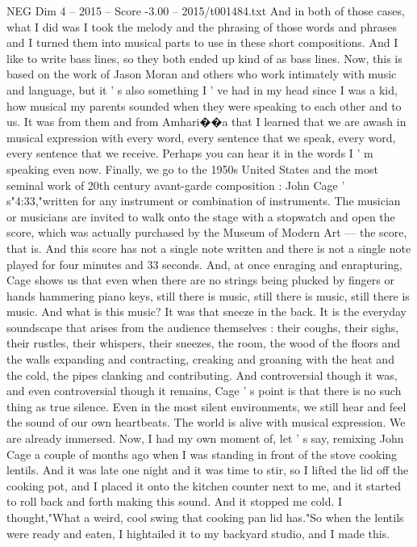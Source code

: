 \begin{textsample}{NEG Dim 4 – 2015 – Score -3.00 – 2015/t001484.txt}
And in both of those cases, what I did was I took the melody and the phrasing of those words and phrases and I turned them into musical parts to use in these short compositions.
And I like to write bass lines, so they both ended up kind of as bass lines.
Now, this is based on the work of Jason Moran and others who work intimately with music and language, but it ' s also something I ' ve had in my head since I was a kid, how musical my parents sounded when they were speaking to each other and to us.
It was from them and from Amhari{\EmojiFont �}{\EmojiFont �}a that I learned that we are awash in musical expression with every word, every sentence that we speak, every word, every sentence that we receive.
Perhaps you can hear it in the words I ' m speaking even now.
Finally, we go to the 1950s United States and the most seminal work of 20th century avant-garde composition : John Cage ' s"4:33,"written for any instrument or combination of instruments.
The musician or musicians are invited to walk onto the stage with a stopwatch and open the score, which was actually purchased by the Museum of Modern Art — the score, that is.
And this score has not a single note written and there is not a single note played for four minutes and 33 seconds.
And, at once enraging and enrapturing, Cage shows us that even when there are no strings being plucked by fingers or hands hammering piano keys, still there is music, still there is music, still there is music.
And what is this music?
It was that sneeze in the back.
It is the everyday soundscape that arises from the audience themselves : their coughs, their sighs, their rustles, their whispers, their sneezes, the room, the wood of the floors and the walls expanding and contracting, creaking and groaning with the heat and the cold, the pipes clanking and contributing.
And controversial though it was, and even controversial though it remains, Cage ' s point is that there is no such thing as true silence.
Even in the most silent environments, we still hear and feel the sound of our own heartbeats.
The world is alive with musical expression.
We are already immersed.
Now, I had my own moment of, let ' s say, remixing John Cage a couple of months ago when I was standing in front of the stove cooking lentils.
And it was late one night and it was time to stir, so I lifted the lid off the cooking pot, and I placed it onto the kitchen counter next to me, and it started to roll back and forth making this sound.
And it stopped me cold.
I thought,"What a weird, cool swing that cooking pan lid has."So when the lentils were ready and eaten, I hightailed it to my backyard studio, and I made this.

\end{textsample}
